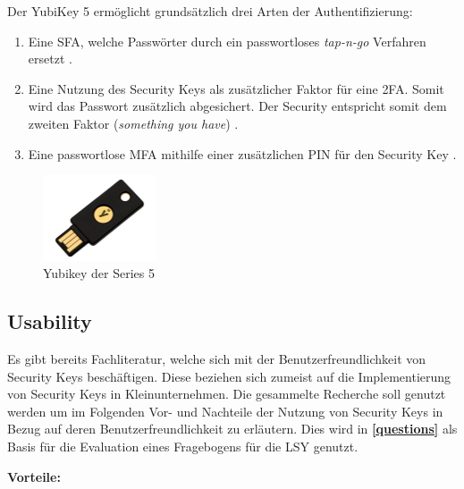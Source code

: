 Der YubiKey 5 ermöglicht grundsätzlich drei Arten der Authentifizierung:

\begin{enumerate}
    \item Eine \ac{SFA}, welche Passwörter durch ein passwortloses \textit{tap-n-go} Verfahren ersetzt \cite{yuibkey2023fido2}.
    \item Eine Nutzung des Security Keys als zusätzlicher Faktor für eine \ac{2FA}. Somit wird das Passwort zusätzlich abgesichert. Der Security entspricht somit dem zweiten Faktor (\textit{something you have}) \cite{yuibkey2023fido2}.
    \item Eine passwortlose \ac{MFA} mithilfe einer zusätzlichen PIN für den Security Key \cite{yuibkey2023fido2}.
\end{enumerate}

\begin{figure}[h]
	\centering 
	\includegraphics[width=0.3\textwidth]{img/abbildungen/yubikey.jpeg}
	\captionsetup{format=hang}
	\caption{Yubikey der Series 5 \cite{yubikeypic}} \label{yubikey}
\end{figure}

\subsection{Usability}
Es gibt bereits Fachliteratur, welche sich mit der Benutzerfreundlichkeit von Security Keys beschäftigen. Diese beziehen sich zumeist auf die Implementierung von Security Keys in Kleinunternehmen. Die gesammelte Recherche soll genutzt werden um im Folgenden Vor- und Nachteile der Nutzung von Security Keys in Bezug auf deren Benutzerfreundlichkeit zu erläutern. Dies wird in \textbf{\ref{questions}} als Basis für die Evaluation eines Fragebogens für die \ac{LSY} genutzt.

\textbf{Vorteile:}

